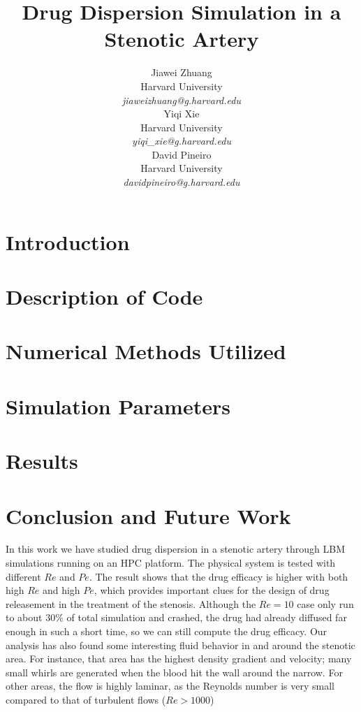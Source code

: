 \documentclass{article}
\title{Drug Dispersion Simulation in a Stenotic Artery}
\author{
   Jiawei Zhuang \\
   Harvard University\\
   \textit{jiaweizhuang@g.harvard.edu}\\
   \And
   Yiqi Xie \\
   Harvard University \\
   \textit{yiqi\_xie@g.harvard.edu}\\
   \And
   David Pineiro \\
   Harvard University \\
   \textit{davidpineiro@g.harvard.edu}\\
}
\begin{document}
\maketitle

\section{Introduction}


\section{Description of Code}


\section{Numerical Methods Utilized}


\section{Simulation Parameters}


\clearpage
\section{Results}



\section{Conclusion and Future Work}
In this work we have studied drug dispersion in a stenotic artery through LBM simulations running on an HPC platform. The physical system is tested with different $Re$ and $Pe$. The result shows that the drug efficacy is higher with both high $Re$ and high $Pe$, which provides important clues for the design of drug releasement in the treatment of the stenosis. Although the $Re=10$ case only run to about 30\% of total simulation and crashed, the drug had already diffused far enough in such a short time, so we can still compute the drug efficacy. Our analysis has also found some interesting fluid behavior in and around the stenotic area. For instance, that area has the highest density gradient and velocity; many small whirls are generated when the blood hit the wall around the narrow. For other areas, the flow is highly laminar, as the Reynolds number is very small compared to that of turbulent flows ($Re>1000$)
\end{document}
